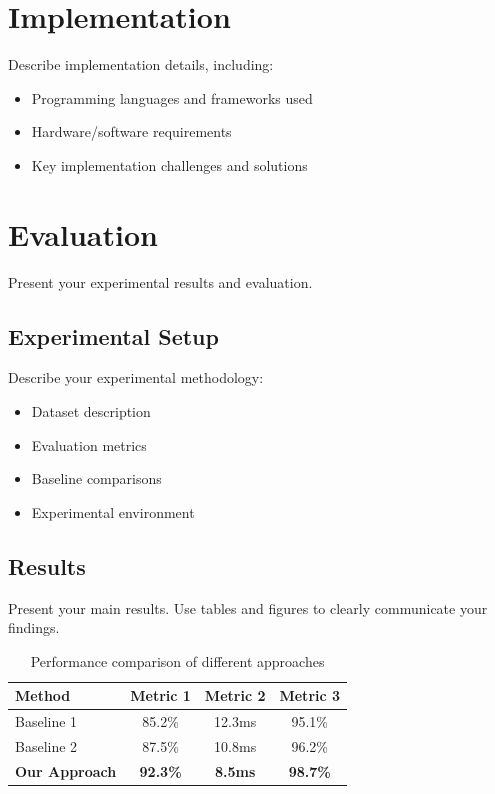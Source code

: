 \documentclass[10pt,conference]{IEEEtran}
\begin{document}
\section{Implementation}
\label{sec:implementation}

Describe implementation details, including:
\begin{itemize}
    \item Programming languages and frameworks used
    \item Hardware/software requirements
    \item Key implementation challenges and solutions
\end{itemize}

\section{Evaluation}
\label{sec:evaluation}

Present your experimental results and evaluation.

\subsection{Experimental Setup}
Describe your experimental methodology:
\begin{itemize}
    \item Dataset description
    \item Evaluation metrics
    \item Baseline comparisons
    \item Experimental environment
\end{itemize}

\subsection{Results}
Present your main results. Use tables and figures to clearly communicate your findings.

\begin{table}[t]
\centering
\caption{Performance comparison of different approaches}
\label{tab:performance}
\begin{tabular}{@{}lccc@{}}
\toprule
Method & Metric 1 & Metric 2 & Metric 3 \\
\midrule
Baseline 1 & 85.2\% & 12.3ms & 95.1\% \\
Baseline 2 & 87.5\% & 10.8ms & 96.2\% \\
\textbf{Our Approach} & \textbf{92.3\%} & \textbf{8.5ms} & \textbf{98.7\%} \\
\bottomrule
\end{tabular}
\end{table}
\end{document}
